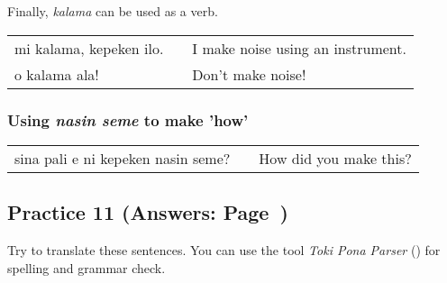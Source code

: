 Finally, \textit{kalama} can be used as a verb. \\
\begin{supertabular}{p{5,5cm}|ll}
mi kalama, kepeken ilo. && I make noise using an instrument. \\
o kalama ala! && Don't make noise! \\
\end{supertabular}  
%
\subsubsection*{Using \textit{nasin seme} to make 'how'}
%
\begin{supertabular}{p{5,5cm}|ll}
sina pali e ni kepeken nasin seme? && How did you make this? \\
\end{supertabular}  
%
%
\subsection*{Practice 11 (Answers: Page~\pageref{'pi'})}
%
Try to translate these sentences. 
You can use the tool \textit{Toki Pona Parser} (\cite{www:rowa:02}) for spelling and grammar check. 

